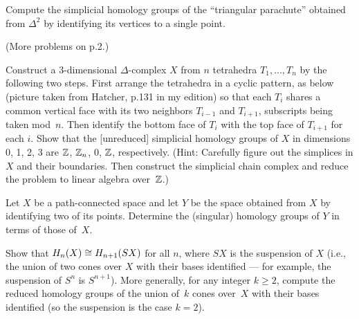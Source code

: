 \bigskip\prob [Hatcher \S2.1, \#4]  Compute the simplicial homology groups of the ``triangular parachute'' obtained from $\Delta^2$ by identifying its vertices to a single point.

\bigskip (More problems on p.2.) \pagebreak

\prob [Hatcher \S2.1, \#8] Construct a $3$-dimensional $\Delta$-complex $X$ from $n$ tetrahedra $T_1,\dots,T_n$ by the following two steps. First arrange the tetrahedra in a cyclic pattern, as below (picture taken from Hatcher, p.131 in my edition) so that each $T_i$ shares a common vertical face with its two neighbors $T_{i-1}$ and $T_{i+1}$, subscripts being taken mod~$n$.
  Then identify the bottom face of $T_i$ with the top face of $T_{i+1}$ for each $i$. Show that the [unreduced] simplicial homology groups of $X$ in dimensions 0, 1, 2, 3 are $\mathbb{Z}$, $\mathbb{Z}_n$, 0, $\mathbb{Z}$, respectively.  (Hint: Carefully figure out the simplices in $X$ and their boundaries.  Then construct the simplicial chain complex and reduce the problem to linear algebra over~$\mathbb{Z}$.)

\bigskip\prob Let $X$ be a path-connected space and let $Y$ be the space obtained from $X$ by identifying two of its points.  Determine the (singular) homology groups of $Y$ in terms of those of~$X$.

\bigskip\prob [Hatcher \S2.1, \#20]  Show that $H_n(X)\cong H_{n+1}(SX)$ for all $n$, where $SX$ is the suspension of $X$ (i.e., the union of two cones over $X$ with their bases identified --- for example, the suspension of $S^n$ is $S^{n+1}$).  More generally, for any integer $k\geq 2$, compute the reduced homology groups of the union of~$k$ cones over~$X$ with their bases identified (so the suspension is the case $k=2$).

